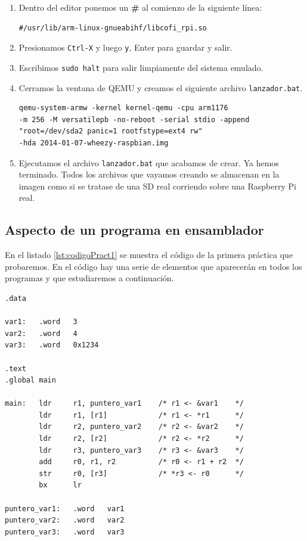 \begin{enumerate}
\begin{lstlisting}
\end{lstlisting}
  \item Dentro del editor ponemos un {\bf \#} al comienzo de la siguiente línea:
\begin{lstlisting}
#/usr/lib/arm-linux-gnueabihf/libcofi_rpi.so
\end{lstlisting}
  \item Presionamos {\tt Ctrl-X} y luego {\tt y}, Enter para guardar y salir.
  \item Escribimos {\tt sudo halt} para salir limpiamente del sistema emulado.
  \item Cerramos la ventana de QEMU y creamos el siguiente archivo {\tt lanzador.bat}.
\begin{lstlisting}
qemu-system-armw -kernel kernel-qemu -cpu arm1176
-m 256 -M versatilepb -no-reboot -serial stdio -append
"root=/dev/sda2 panic=1 rootfstype=ext4 rw"
-hda 2014-01-07-wheezy-raspbian.img
\end{lstlisting}
  \item Ejecutamos el archivo {\tt lanzador.bat} que acabamos de crear.
Ya hemos terminado. Todos los archivos que vayamos creando
se almacenan en la imagen como si se tratase de una SD real corriendo sobre una
Raspberry Pi real.
\end{enumerate}

\subsection{Aspecto de un programa en ensamblador}

En el listado \ref{lst:codigoPract1} se muestra el código de la primera
práctica que probaremos. En el código hay una serie de elementos que
aparecerán en todos los programas y que estudiaremos a continuación.

\begin{lstlisting}[caption={Código del programa intro1.s},label={lst:codigoPract1}]
.data

var1:   .word   3
var2:   .word   4
var3:   .word   0x1234

.text
.global main
 
main:   ldr     r1, puntero_var1    /* r1 <- &var1    */
        ldr     r1, [r1]            /* r1 <- *r1      */
        ldr     r2, puntero_var2    /* r2 <- &var2    */
        ldr     r2, [r2]            /* r2 <- *r2      */
        ldr     r3, puntero_var3    /* r3 <- &var3    */
        add     r0, r1, r2          /* r0 <- r1 + r2  */
        str     r0, [r3]            /* *r3 <- r0      */
        bx      lr

puntero_var1:   .word   var1
puntero_var2:   .word   var2
puntero_var3:   .word   var3
\end{lstlisting}


